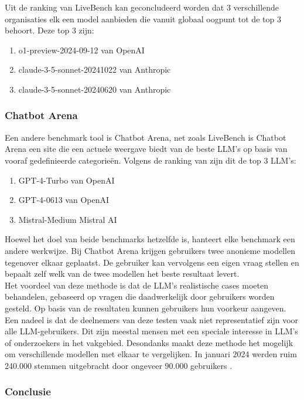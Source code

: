 Uit de ranking van LiveBench kan geconcludeerd worden dat 3 verschillende organisaties elk een model aanbieden die vanuit globaal oogpunt tot de top 3 behoort. Deze top 3 zijn: 
\begin{enumerate}
    \item o1-preview-2024-09-12 van OpenAI
    \item claude-3-5-sonnet-20241022 van Anthropic
    \item claude-3-5-sonnet-20240620 van Anthropic
\end{enumerate}

\subsubsection{Chatbot Arena} 

Een andere benchmark tool is Chatbot Arena, net zoals LiveBench is Chatbot Arena een site die een actuele weergave biedt van de beste LLM's op basis van vooraf gedefinieerde categorieën. 
Volgens de ranking van \textcite{chiang2024chatbotarenaopenplatform} zijn dit de top 3 LLM's:

\begin{enumerate}
    \item GPT-4-Turbo van OpenAI
    \item GPT-4-0613 van OpenAI
    \item Mistral-Medium Mistral AI
\end{enumerate}

Hoewel het doel van beide benchmarks hetzelfde is, hanteert elke benchmark een andere werkwijze. Bij Chatbot Arena krijgen gebruikers twee anonieme modellen tegenover elkaar geplaatst. De gebruiker kan vervolgens een eigen vraag stellen en bepaalt zelf welk van de twee modellen het beste resultaat levert.
\\[1em]
Het voordeel van deze methode is dat de LLM's realistische cases moeten behandelen, gebaseerd op vragen die daadwerkelijk door gebruikers worden gesteld. Op basis van de resultaten kunnen gebruikers hun voorkeur aangeven. Een nadeel is dat de deelnemers van deze testen vaak niet representatief zijn voor alle LLM-gebruikers. Dit zijn meestal mensen met een speciale interesse in LLM's of onderzoekers in het vakgebied. Desondanks maakt deze methode het mogelijk om verschillende modellen met elkaar te vergelijken. In januari 2024 werden ruim 240.000 stemmen uitgebracht door ongeveer 90.000 gebruikers \autocite{chiang2024chatbotarenaopenplatform}. 

\subsubsection{Conclusie}

